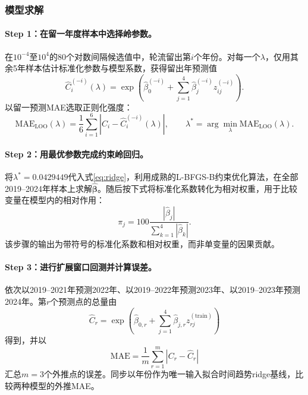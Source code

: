 \documentclass[12pt,a4paper]{ctexart}
\theoremstyle{definition}
\theoremstyle{plain}
\theoremstyle{remark}
\begin{document}
\subsubsection{模型求解}
\paragraph{\textbf{Step 1：在留一年度样本中选择岭参数。}}
在$10^{-4}$至$10^{4}$的80个对数间隔候选值中，轮流留出第$i$个年份。对每一个$\lambda$，仅用其余5年样本估计标准化参数与模型系数，获得留出年预测值
\begin{equation}
\widehat{C}_{i}^{(-i)}(\lambda)=\exp\left(\widehat{\beta}_0^{(-i)}+\sum_{j=1}^{4}\widehat{\beta}_j^{(-i)}z_{ij}^{(-i)}\right).
\label{eq:q2-loo-pred}
\end{equation}
以留一预测MAE选取正则化强度：
\begin{equation}
\mathrm{MAE}_{\mathrm{LOO}}(\lambda)=\frac{1}{6}\sum_{i=1}^{6}\left|C_i-\widehat{C}_{i}^{(-i)}(\lambda)\right|,\qquad \lambda^*=\arg\min_{\lambda}\mathrm{MAE}_{\mathrm{LOO}}(\lambda).
\label{eq:q2-loo-mae}
\end{equation}

\paragraph{\textbf{Step 2：用最优参数完成约束岭回归。}}
将$\lambda^*=0.0429449$代入式\eqref{eq:ridge}，利用成熟的L-BFGS-B约束优化算法，在全部2019--2024年样本上求解$\widehat{\bm\beta}$。随后按下式将标准化系数转化为相对权重，用于比较变量在模型内的相对作用：
\begin{equation}
\pi_j=100\frac{|\widehat{\beta}_j|}{\sum_{k=1}^{4}|\widehat{\beta}_k|}.
\label{eq:q2-step-importance}
\end{equation}
该步骤的输出为带符号的标准化系数和相对权重，而非单变量的因果贡献。

\paragraph{\textbf{Step 3：进行扩展窗口回测并计算误差。}}
依次以2019--2021年预测2022年、以2019--2022年预测2023年、以2019--2023年预测2024年。第$r$个预测点的总量由
\begin{equation}
\widehat{C}_r=\exp\left(\widehat{\beta}_{0,r}+\sum_{j=1}^{4}\widehat{\beta}_{j,r}z_{rj}^{(\mathrm{train})}\right)
\label{eq:q2-expanding-pred}
\end{equation}
得到，并以
\begin{equation}
\mathrm{MAE}=\frac{1}{m}\sum_{r=1}^{m}|C_r-\widehat{C}_r|
\label{eq:q2-step-mae}
\end{equation}
汇总$m=3$个外推点的误差。同步以年份作为唯一输入拟合时间趋势ridge基线，比较两种模型的外推MAE。
\end{document}
